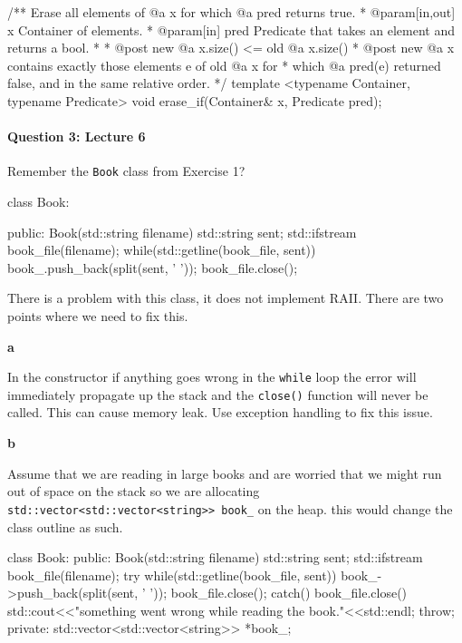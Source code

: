 \documentclass[12pt,letterpaper,twoside]{article}
\begin{document}
\begin{cpp}
/** Erase all elements of @a x for which @a pred returns true.
 * @param[in,out] x Container of elements.
 * @param[in] pred Predicate that takes an element and returns a bool.
 *
 * @post new @a x.size() <= old @a x.size()
 * @post new @a x contains exactly those elements e of old @a x for 
 *     which @a pred(e) returned false, and in the same relative order.
 */
template <typename Container, typename Predicate>
void erase_if(Container& x, Predicate pred);
\end{cpp}

\paragraph{Question 3: Lecture 6}
Remember the \texttt{Book} class from Exercise 1?
\begin{cpp}
	class Book:
	{
		public:
		Book(std::string filename) 
		{
			std::string sent;
			std::ifstream book_file(filename);
			while(std::getline(book_file, sent))
			{
				book_.push_back(split(sent, ' '));
			}
			book_file.close();
		}
		
	}
\end{cpp}

There is a problem with this class, it does not implement RAII. There are two points where we need to fix this.

\textbf{a}

In the constructor if anything goes wrong in the \texttt{while} loop the error will immediately propagate up the stack and the \texttt{close()} function will never be called. This can cause memory leak. Use exception handling to fix this issue.

\textbf{b}

Assume that we are reading in large books and are worried that we might run out of space on the stack so we are allocating \texttt{std::vector<std::vector<string>> book\_} on the heap. this would change the class outline as such.
	\begin{cpp}
	class Book:
	{
		public:
		Book(std::string filename) 
		{
			std::string sent;
			std::ifstream book_file(filename);
			try{
				while(std::getline(book_file, sent))
				{
					book_->push_back(split(sent, ' '));
				}
				book_file.close();
			}
			catch(){
				book_file.close()
				std::cout<<"something went wrong while reading the book."<<std::endl;
				throw;
			}	
		}
		private:
		std::vector<std::vector<string>> *book_;
	}
\end{cpp}
\end{document}
